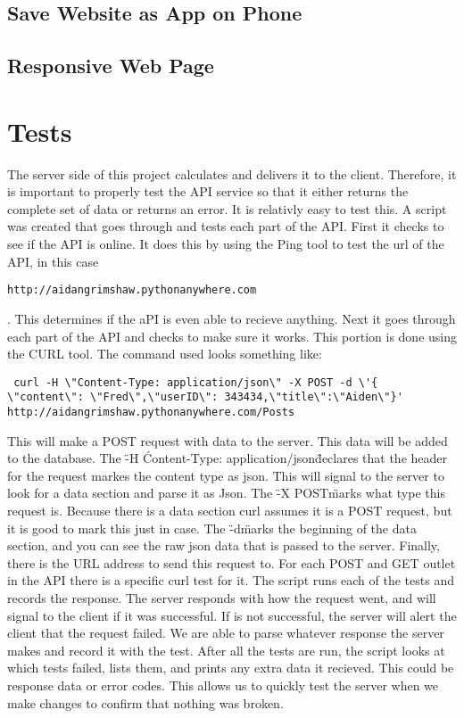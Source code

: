 \documentclass[12pt]{article}
\begin{document}
\subsection{Save Website as App on Phone}

\subsection{Responsive Web Page}

\section{Tests}

The server side of this project calculates and delivers it to the client.
Therefore, it is important to properly test the API service so that it either
returns the complete set of data or returns an error.  It is relativly easy to
test this.  A script was created that goes through and tests each part of the
API.  First it checks to see if the API is online.  It does this by using the
Ping tool to test the url of the API, in this case
\begin{verbatim}http://aidangrimshaw.pythonanywhere.com \end{verbatim}.  This
determines if the aPI is even able to recieve anything.  Next it goes through
each part of the API and checks to make sure it works.  This portion is done
using the CURL tool.  The command used looks something like:

\begin{verbatim} curl -H \"Content-Type: application/json\" -X POST -d \'{
\"content\": \"Fred\",\"userID\": 343434,\"title\":\"Aiden\"}'
http://aidangrimshaw.pythonanywhere.com/Posts \end{verbatim}

This will make a POST request with data to the server.  This data will be added
to the database.  The \"-H \'Content-Type: application/json\" declares that the
header for the request markes the content type as json.  This will signal to the
server to look for a data section and parse it as Json.  The \"-X POST\" marks
what type this request is.  Because there is a data section curl assumes it is a
POST request, but it is good to mark this just in case.  The \"-d\" marks the
beginning of the data section, and you can see the raw json data that is passed
to the server.  Finally, there is the URL address to send this request to.  For
each POST and GET outlet in the API there is a specific curl test for it.  The
script runs each of the tests and records the response.  The server responds
with how the request went, and will signal to the client if it was successful.
If is not successful, the server will alert the client that the request failed.
We are able to parse whatever response the server makes and record it with the
test.  After all the tests are run, the script looks at which tests failed,
lists them, and prints any extra data it recieved.  This could be response data
or error codes.  This allows us to quickly test the server when we make changes
to confirm that nothing was broken.
\end{document}
